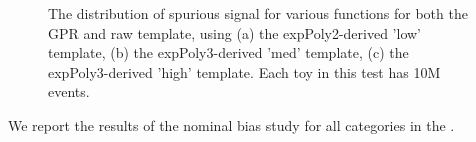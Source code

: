 \begin{figure} 
\begin{center}

\caption{The distribution of spurious signal for various functions for both the GPR and raw template, using (a) the expPoly2-derived 'low' template, (b) the expPoly3-derived 'med' template, (c) the expPoly3-derived 'high' template. Each toy in this test has 10M events.}
\label{fig:lowpt_10M_noSig}
\end{center}
\end{figure}

We report the results of the nominal bias study for all categories in the \Tab{\ref{tab:NoSigSS}}.

